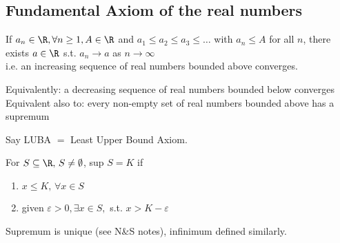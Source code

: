 \subsection{Fundamental Axiom of the real numbers}
\begin{axiom}
If $a_n \in \R, \forall n \geq 1, A \in \R$ and $a_1 \leq a_2 \leq a_3 \leq \dots$ with $ a_n \leq A$ for all $n$, there exists $a\in\R$ s.t. $a_n \to a$ as $n\to \infty$\\
i.e. an increasing sequence of real numbers bounded above converges.\\
\begin{note}
Equivalently: a decreasing sequence of real numbers bounded below converges\\
Equivalent also to: every non-empty set of real numbers bounded above has a supremum
\end{note}
\begin{notation}
Say LUBA $=$ Least Upper Bound Axiom.
\end{notation}
\end{axiom}
\begin{definition}[supremum]
For $S \subseteq \R,\, S \neq \emptyset$, sup $S = K$ if
\begin{enumerate}
    \item $x \leq K,\, \forall x \in S$
    \item given $\varepsilon > 0, \exists x \in S,$ s.t. $x > K - \varepsilon$
\end{enumerate}
\begin{note}
Supremum is unique (see N\&S notes), infinimum defined similarly.
\end{note}
\end{definition}
